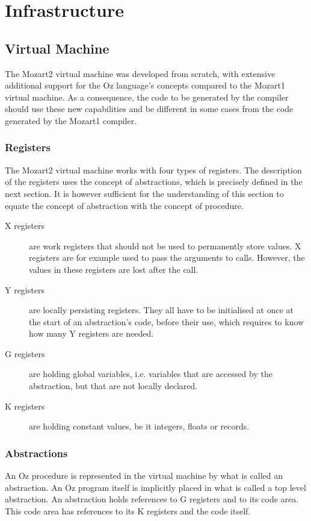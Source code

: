 \documentclass[a4paper]{memoir}
\begin{document}
\chapter{Infrastructure}
\section{Virtual Machine}
The Mozart2 virtual machine was developed from scratch, with extensive additional support for the Oz language's concepts compared to the Mozart1 virtual machine. As a consequence, the code to be generated by the compiler should use these new capabilities and be different in some cases from the code generated by the Mozart1 compiler.


\subsection{Registers}\label{sec:intro:registers}
The Mozart2 virtual machine works with four types of registers. The description of the registers uses the concept of abstractions, which is precisely defined in the next section. It is however sufficient for the understanding of this section to equate the concept of abstraction with the concept of procedure.
\begin{description}
  \item[X registers]are work registers that should not be used to permanently
    store values. X registers are for example used to pass the arguments to calls. However, the values in these registers are lost after the call. %
  \item[Y registers]are locally persisting registers. They all have to be initialised at once at the start of an abstraction's code, before their use, which requires to know how many Y registers are needed.
  \item[G registers] are holding global variables, i.e. variables that are accessed by the abstraction, but that are not locally declared.
  \item[K registers] are holding constant values, be it integers, floats or records.
\end{description}

\subsection{Abstractions}\label{sec:vm:abstractions}
An Oz procedure is represented in the virtual machine by what is called an abstraction. An Oz program itself is implicitly placed in what is called a top level abstraction.
An abstraction holds references to G registers and to its code area. This code area has references to its K registers and the code itself. 
\end{document}
